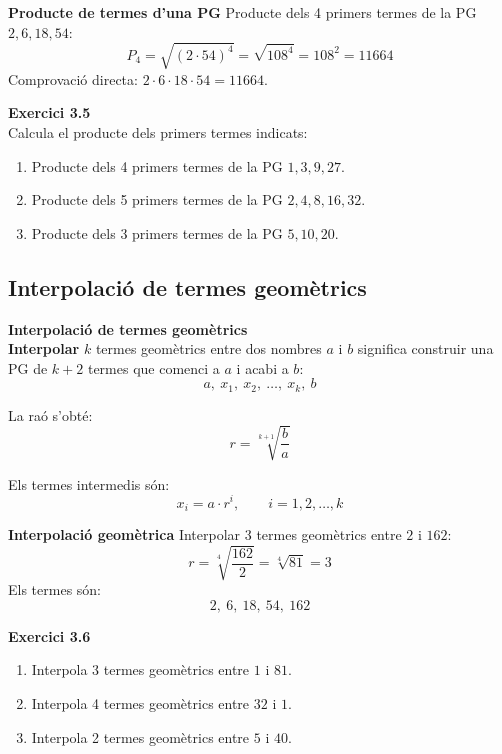 \documentclass[12pt]{article}
\begin{document}
\begin{exemple}
\textbf{Producte de termes d'una PG}
Producte dels 4 primers termes de la PG $2, 6, 18, 54$:
\[
P_4 = \sqrt{(2 \cdot 54)^4} = \sqrt{108^4} = 108^2 = 11664
\]
Comprovació directa: $2 \cdot 6 \cdot 18 \cdot 54 = 11664$. \checkmark
\end{exemple}

\begin{exercici}
\textbf{Exercici 3.5}\\
Calcula el producte dels primers termes indicats:
\begin{enumerate}[label=\alph*)]
    \item Producte dels 4 primers termes de la PG $1, 3, 9, 27$.
    \item Producte dels 5 primers termes de la PG $2, 4, 8, 16, 32$.
    \item Producte dels 3 primers termes de la PG $5, 10, 20$.
\end{enumerate}
\end{exercici}

\subsection{Interpolació de termes geomètrics}

\begin{concept}
\textbf{Interpolació de termes geomètrics}\\
\textbf{Interpolar} $k$ termes geomètrics entre dos nombres $a$ i $b$ significa construir una PG de $k+2$ termes que comenci a $a$ i acabi a $b$:
\[
a, \ x_1, \ x_2, \ \dots, \ x_k, \ b
\]

La raó s'obté:
\[
\boxed{r = \sqrt[k+1]{\dfrac{b}{a}}}
\]

Els termes intermedis són:
\[
x_i = a \cdot r^i, \qquad i = 1, 2, \dots, k
\]
\end{concept}

\begin{exemple}
\textbf{Interpolació geomètrica}
Interpolar 3 termes geomètrics entre $2$ i $162$:
\[
r = \sqrt[4]{\dfrac{162}{2}} = \sqrt[4]{81} = 3
\]
Els termes són:
\[
2, \ 6, \ 18, \ 54, \ 162
\]
\end{exemple}

\begin{exercici}
\textbf{Exercici 3.6}\\
\begin{enumerate}[label=\alph*)]
    \item Interpola 3 termes geomètrics entre $1$ i $81$.
    \item Interpola 4 termes geomètrics entre $32$ i $1$.
    \item Interpola 2 termes geomètrics entre $5$ i $40$.
\end{enumerate}
\end{exercici}
\end{document}
